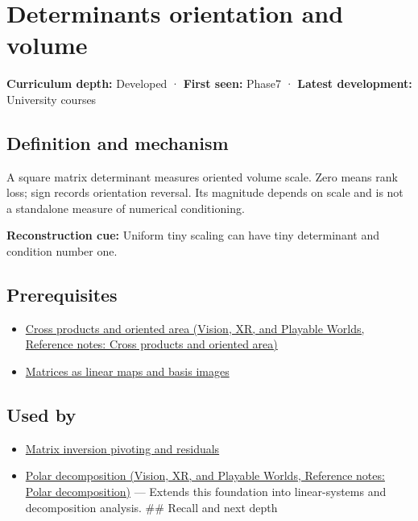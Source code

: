 \hypertarget{appendix-da478be01d02}{}\label{referencestart:appendix-da478be01d02}
\section{Determinants orientation and volume}\label{appendix-da478be01d02-determinants-orientation-and-volume}

\textbf{Curriculum depth:} Developed · \textbf{First seen:} Phase7 · \textbf{Latest development:} University courses

\begin{allmightroledefinition}

\subsection{Definition and mechanism}\label{appendix-da478be01d02-definition-and-mechanism}

A square matrix determinant measures oriented volume scale. Zero means rank loss; sign records orientation reversal. Its magnitude depends on scale and is not a standalone measure of numerical conditioning.

\end{allmightroledefinition}

\textbf{Reconstruction cue:} Uniform tiny scaling can have tiny determinant and condition number one.

\subsection{Prerequisites}\label{appendix-da478be01d02-prerequisites}

\begin{itemize}
\tightlist
\item
  \href{../07-Vision-XR-and-Playable-Worlds/main.pdf\#nameddest=appendix-2391db8052b1}{Cross products and oriented area (Vision, XR, and Playable Worlds, Reference notes: Cross products and oriented area)}
\item
  \hyperref[appendix-bd39c3bf5d64]{Matrices as linear maps and basis images}
\end{itemize}

\subsection{Used by}\label{appendix-da478be01d02-used-by}

\begin{itemize}
\tightlist
\item
  \hyperref[appendix-48d2e66378ab]{Matrix inversion pivoting and residuals}
\item
  \href{../07-Vision-XR-and-Playable-Worlds/main.pdf\#nameddest=appendix-73f5bcf7a462}{Polar decomposition (Vision, XR, and Playable Worlds, Reference notes: Polar decomposition)} --- Extends this foundation into linear-systems and decomposition analysis. \#\# Recall and next depth
\end{itemize}

